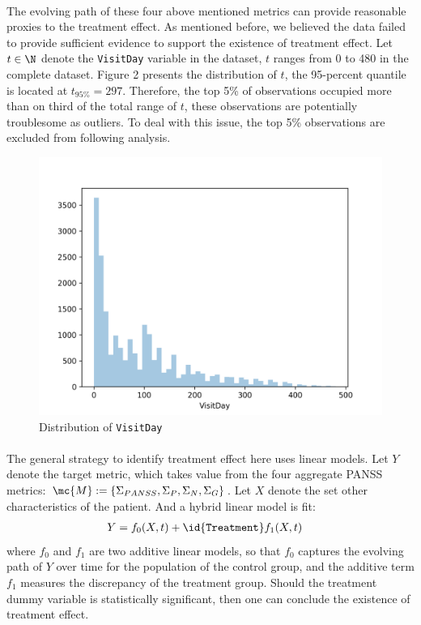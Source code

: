 \documentclass[11pt]{article}
\begin{document}
	\paragraph{}The evolving path of these four above mentioned metrics can provide reasonable proxies to the treatment effect. As mentioned before, we believed the data failed to provide sufficient evidence to support the existence of treatment effect. Let $t \in \N$ denote the \texttt{VisitDay} variable in the dataset, $t$ ranges from 0 to 480 in the complete dataset. Figure 2 presents the distribution of $t$, the 95-percent quantile is located at $t_{95\%} = 297$. Therefore, the top 5\% of observations occupied more than on third of the total range of $t$, these observations are potentially troublesome as outliers. To deal with this issue, the top 5\% observations are excluded from following analysis.

	\begin{figure}[H]
		\centering
		\includegraphics[width=0.7\linewidth]{figures/dist_visit_day_all.png}
		\caption{Distribution of \texttt{VisitDay}}
	\end{figure}
	
	\paragraph{}The general strategy to identify treatment effect here uses linear models. Let $Y$ denote the target metric, which takes value from the four aggregate PANSS metrics: $\mc{M} := \{ \Sigma_{PANSS}, \Sigma_P, \Sigma_N, \Sigma_G\}$. Let $X$ denote the set other characteristics of the patient. And a hybrid linear model is fit:
	\begin{align}
		Y &= f_0(X, t) + \id{\texttt{Treatment}} f_1(X, t)
	\end{align}
	where $f_0$ and $f_1$ are two additive linear models, so that $f_0$ captures the evolving path of $Y$ over time for the population of the control group, and the additive term $f_1$ measures the discrepancy of the treatment group.
	Should the treatment dummy variable is statistically significant, then one can conclude the existence of treatment effect.
\end{document}

